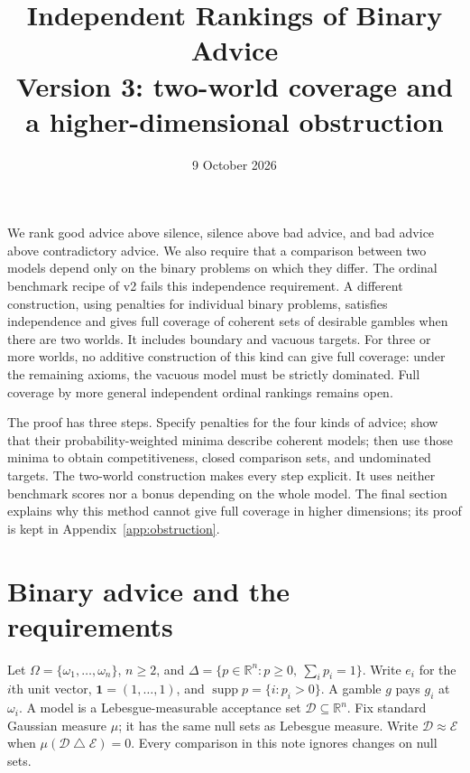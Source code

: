 \documentclass[11pt]{article}
\title{Independent Rankings of Binary Advice\\[3pt]\large Version 3: two-world coverage and a higher-dimensional obstruction}
\author{}
\date{9 October 2026}
\theoremstyle{remark}
\newcommand{\R}{\mathbb R}
\newcommand{\Dscr}{\mathcal D}
\newcommand{\Escr}{\mathcal E}
\newcommand{\one}{\mathbf 1}
\newcommand{\supp}{\operatorname{supp}}
\newcommand{\sd}{\mathbin{\triangle}}
\begin{document}
\maketitle

\noindent
We rank good advice above silence, silence above bad advice, and bad advice
above contradictory advice. We also require that a comparison between two
models depend only on the binary problems on which they differ.
The ordinal benchmark recipe of v2 fails this independence requirement.
A different construction, using penalties for individual binary problems,
satisfies independence and gives full coverage of coherent sets of desirable
gambles when there are two worlds. It includes boundary and vacuous targets.
For three or more worlds, no additive construction of this kind can give
full coverage: under the remaining axioms, the vacuous model must be strictly
dominated. Full coverage by more general independent ordinal rankings
remains open.

The proof has three steps. Specify penalties for the four kinds of advice;
show that their probability-weighted minima describe coherent models; then
use those minima to obtain competitiveness, closed comparison sets, and
undominated targets. The two-world construction makes every step explicit.
It uses neither benchmark scores nor a bonus depending on the whole model.
The final section explains why this method cannot give full coverage in
higher dimensions; its proof is kept in Appendix~\ref{app:obstruction}.

\section{Binary advice and the requirements}

Let $\Omega=\{\omega_1,\ldots,\omega_n\}$, $n\ge2$, and
$\Delta=\{p\in\R^n:p\ge0,\ \sum_i p_i=1\}$.
Write $e_i$ for the $i$th unit vector, $\one=(1,\ldots,1)$, and
$\supp p=\{i:p_i>0\}$. A gamble $g$ pays $g_i$ at $\omega_i$.
A model is a Lebesgue-measurable acceptance set $\Dscr\subseteq\R^n$.
Fix standard Gaussian measure $\mu$; it has the same null sets as Lebesgue
measure. Write $\Dscr\approx\Escr$ when $\mu(\Dscr\sd\Escr)=0$.
Every comparison in this note ignores changes on null sets.
\end{document}
